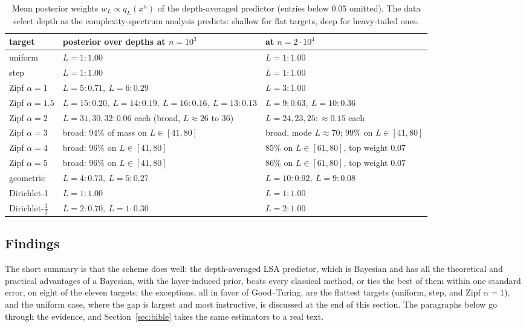 \documentclass[11pt]{article}
\begin{document}
\begin{table}[t]
  \centering
  \small
  \begin{tabular}{lll}
    \toprule
    target & posterior over depths at \(n=10^3\) & at \(n=2\cdot10^4\)\\
    \midrule
    uniform & \(L{=}1:1.00\) & \(L{=}1:1.00\)\\
    step & \(L{=}1:1.00\) & \(L{=}1:1.00\)\\
    Zipf \(\alpha=1\) & \(L{=}5:0.71,\ L{=}6:0.29\) & \(L{=}3:1.00\)\\
    Zipf \(\alpha=1.5\) & \(L{=}15:0.20,\ L{=}14:0.19,\ L{=}16:0.16,\ L{=}13:0.13\) & \(L{=}9:0.63,\ L{=}10:0.36\)\\
    Zipf \(\alpha=2\) & \(L{=}31,30,32:0.06\) each (broad, \(L\approx26\) to \(36\)) & \(L{=}24,23,25:{\approx}0.15\) each\\
    Zipf \(\alpha=3\) & broad: \(94\%\) of mass on \(L\in[41,80]\) & broad, mode \(L{\approx}70\); \(99\%\) on \(L\in[41,80]\)\\
    Zipf \(\alpha=4\) & broad: \(96\%\) on \(L\in[41,80]\) & \(85\%\) on \(L\in[61,80]\), top weight \(0.07\)\\
    Zipf \(\alpha=5\) & broad: \(96\%\) on \(L\in[41,80]\) & \(86\%\) on \(L\in[61,80]\), top weight \(0.07\)\\
    geometric & \(L{=}4:0.73,\ L{=}5:0.27\) & \(L{=}10:0.92,\ L{=}9:0.08\)\\
    Dirichlet-1 & \(L{=}1:1.00\) & \(L{=}1:1.00\)\\
    Dirichlet-\(\tfrac12\) & \(L{=}2:0.70,\ L{=}1:0.30\) & \(L{=}2:1.00\)\\
    \bottomrule
  \end{tabular}
  \caption{Mean posterior weights \(w_L\propto q_L(x^n)\) of the
depth-averaged predictor (entries below \(0.05\) omitted). The data
select depth as the complexity-spectrum analysis predicts: shallow for
flat targets, deep for heavy-tailed ones.}
  \label{tab:posteriors}
\end{table}
\subsection{Findings}
\label{sec:comparison-findings}
The short summary is that the scheme does well: the depth-averaged
LSA predictor, which is Bayesian and has all the theoretical and practical advantages of a Bayesian, with the layer-induced prior, beats every classical method, or ties the best of them within
one standard error, on eight of the eleven targets; the exceptions, all in
favor of Good--Turing, are the flattest targets (uniform, step, and Zipf
\(\alpha=1\)), and the uniform case, where the gap is largest and most
instructive, is discussed at the end of this section.
The paragraphs below go through the evidence, and
Section~\ref{sec:bible} takes the same estimators to a real text.
\end{document}
